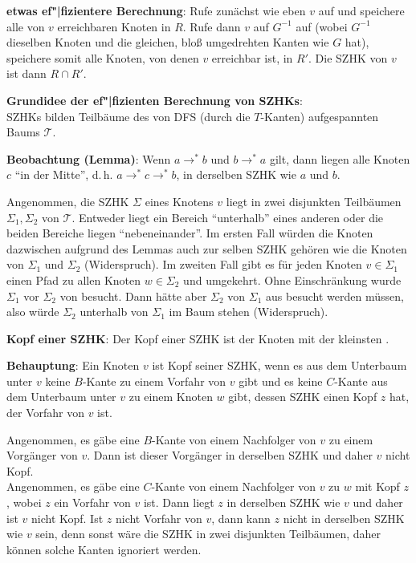 \textbf{etwas ef"|fizientere Berechnung}:
Rufe zunächst wie eben $v$\code{)} auf und speichere alle von $v$
erreichbaren Knoten in $R$.
Rufe dann $v$\code{)} auf $G^{-1}$ auf (wobei $G^{-1}$ dieselben
Knoten und die gleichen, bloß umgedrehten Kanten wie $G$ hat),
speichere somit alle Knoten, von denen $v$ erreichbar ist, in $R'$.
Die SZHK von $v$ ist dann $R \cap R'$.

\linie

\textbf{Grundidee der ef"|fizienten Berechnung von SZHKs}: \\
SZHKs bilden Teilbäume des von DFS (durch die $T$-Kanten) aufgespannten Baums
$\mathcal{T}$.

\textbf{Beobachtung (Lemma)}:
Wenn $a \rightarrow^\ast b$ und $b \rightarrow^\ast a$ gilt, dann liegen
alle Knoten $c$ "`in der Mitte"',
d.\,h. $a \rightarrow^\ast c \rightarrow^\ast b$,
in derselben SZHK wie $a$ und $b$.

\begin{Beweis}
    Angenommen, die SZHK $\Sigma$ eines Knotens $v$ liegt in zwei disjunkten
    Teilbäumen $\Sigma_1, \Sigma_2$ von $\mathcal{T}$.
    Entweder liegt ein Bereich "`unterhalb"' eines anderen oder die beiden
    Bereiche liegen "`nebeneinander"'.
    Im ersten Fall würden die Knoten dazwischen aufgrund des Lemmas auch zur
    selben SZHK gehören wie die Knoten von $\Sigma_1$ und $\Sigma_2$
    (Widerspruch).
    Im zweiten Fall gibt es für jeden Knoten $v \in \Sigma_1$ einen Pfad
    zu allen Knoten $w \in \Sigma_2$ und umgekehrt.
    Ohne Einschränkung wurde $\Sigma_1$ vor $\Sigma_2$ von  besucht.
    Dann hätte aber $\Sigma_2$ von $\Sigma_1$ aus besucht werden müssen, also
    würde $\Sigma_2$ unterhalb von $\Sigma_1$ im Baum stehen (Widerspruch).
\end{Beweis}

\linie

\textbf{Kopf einer SZHK}:
Der Kopf einer SZHK ist der Knoten mit der kleinsten .

\textbf{Behauptung}:
Ein Knoten $v$ ist Kopf seiner SZHK, wenn es aus dem Unterbaum unter $v$
keine $B$-Kante zu einem Vorfahr von $v$ gibt und es keine $C$-Kante
aus dem Unterbaum unter $v$
zu einem Knoten $w$ gibt, dessen SZHK einen Kopf $z$ hat, der Vorfahr von
$v$ ist.

\begin{Beweis}
    Angenommen, es gäbe eine $B$-Kante von einem Nachfolger von $v$ zu einem
    Vorgänger von $v$.
    Dann ist dieser Vorgänger in derselben SZHK und daher $v$ nicht Kopf. \\
    Angenommen, es gäbe eine $C$-Kante von einem Nachfolger von $v$ zu $w$
    mit Kopf $z$, wobei $z$ ein Vorfahr von $v$ ist.
    Dann liegt $z$ in derselben SZHK wie $v$ und daher ist $v$ nicht Kopf.
    Ist $z$ nicht Vorfahr von $v$, dann kann $z$ nicht in derselben SZHK
    wie $v$ sein, denn sonst wäre die SZHK in zwei disjunkten Teilbäumen,
    daher können solche Kanten ignoriert werden.
\end{Beweis}

